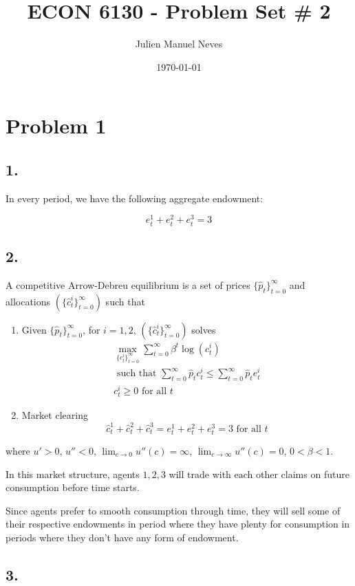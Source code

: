 \documentclass[12pt]{article}
\title{ECON 6130 - Problem Set \# 2}
\date{\today}
\author{Julien Manuel Neves}
\theoremstyle{definition}
\newcommand\st{\text{ such that }}
\newcommand\seq[1]{\{ #1 \}}
\begin{document}
\maketitle

\section*{Problem 1}
\subsection*{1.}

In every period, we have the following aggregate endowment:

\[
e_t^1+e_t^2+e_t^3 = 3
\]

\subsection*{2.}

A competitive Arrow-Debreu equilibrium is a set of prices $\seq{\hat{p}_t}_{t=0}^{\infty}$ and allocations $(\seq{\hat{c}^i_t}_{t=0}^{\infty})$ such that
\begin{enumerate}
	\item Given $\seq{\hat{p}_t}_{t=0}^{\infty}$, for $i = 1, 2$, $(\seq{\hat{c}^i_t}_{t=0}^{\infty})$ solves
	\[
	\begin{split}
	\max_{\seq{c^i_t}_{t=0}^{\infty}} \sum_{t=0}^{\infty}\beta^t \log(c_t^i)\\
	\st \sum_{t=0}^{\infty}\hat{p}_tc_t^i\leq \sum_{t=0}^{\infty}\hat{p}_te_t^i\\
	c_{t}^i\geq 0 \text{ for all }t
	\end{split}
	\]
	\item Market clearing
	\[\hat{c}_t^1+\hat{c}_t^2 + \hat{c}_t^3=e_t^1+e_t^2 + e_t^3 =3 \text{ for all }t \]
\end{enumerate}
where $u'>0$, $u''<0$, $\lim_{c\to 0} u''(c)=\infty$, $\lim_{c\to \infty} u''(c)=0$, $0<\beta<1$.

In this market structure, agents $1,2,3$ will trade with each other claims on future consumption before time starts.

Since agents prefer to smooth consumption through time, they will sell some of their respective endowments in period where they have plenty for consumption in periods where they don't have any form of endowment.


\subsection*{3.}
\end{document}
